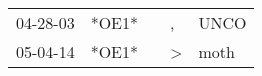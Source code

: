 \begin{supertabular}{lllll}
 04-28-03 &  *OE1* &   &             , &  UNCO \\
 05-04-14 &  *OE1* &   &  \textgreater &  moth \\
\end{supertabular}
